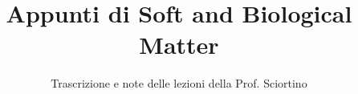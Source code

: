 \documentclass[a4paper,12pt]{article}
\title{Appunti di Soft and Biological Matter}
\author{Trascrizione e note delle lezioni della Prof. Sciortino}
\date{}
\begin{document}
\maketitle
\projectintro
\tableofcontents
\newpage

\end{document}
